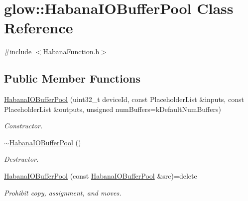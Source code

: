 \hypertarget{classglow_1_1_habana_i_o_buffer_pool}{}\section{glow\+:\+:Habana\+I\+O\+Buffer\+Pool Class Reference}
\label{classglow_1_1_habana_i_o_buffer_pool}


{\ttfamily \#include $<$Habana\+Function.\+h$>$}

\subsection*{Public Member Functions}
\begin{DoxyCompactItemize}
\item 
\mbox{\label{classglow_1_1_habana_i_o_buffer_pool_a0cfe9540dbf66fca5c0b7a0c5b77816a}} 
\hyperlink{classglow_1_1_habana_i_o_buffer_pool_a0cfe9540dbf66fca5c0b7a0c5b77816a}{Habana\+I\+O\+Buffer\+Pool} (uint32\+\_\+t device\+Id, const Placeholder\+List \&inputs, const Placeholder\+List \&outputs, unsigned num\+Buffers=k\+Default\+Num\+Buffers)
\begin{DoxyCompactList}\small\item\em Constructor. \end{DoxyCompactList}\item 
\mbox{\label{classglow_1_1_habana_i_o_buffer_pool_a07ad5d36aafbf9f3871393cb0ce16021}} 
\hyperlink{classglow_1_1_habana_i_o_buffer_pool_a07ad5d36aafbf9f3871393cb0ce16021}{$\sim$\+Habana\+I\+O\+Buffer\+Pool} ()
\begin{DoxyCompactList}\small\item\em Destructor. \end{DoxyCompactList}\item 
\mbox{\label{classglow_1_1_habana_i_o_buffer_pool_afab750ba3fee5713c74add8f58e500b5}} 
\hyperlink{classglow_1_1_habana_i_o_buffer_pool_afab750ba3fee5713c74add8f58e500b5}{Habana\+I\+O\+Buffer\+Pool} (const \hyperlink{classglow_1_1_habana_i_o_buffer_pool}{Habana\+I\+O\+Buffer\+Pool} \&src)=delete
\begin{DoxyCompactList}\small\item\em Prohibit copy, assignment, and moves. \end{DoxyCompactList}\item 

\end{DoxyCompactItemize}
